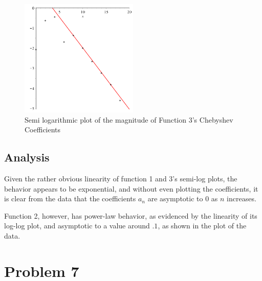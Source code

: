 \documentclass[11pt]{article} %
\begin{document}
{\begin{figure}[H]
\end{figure}
\begin{figure}[H]
\caption*{Semi logarithmic plot of the magnitude of Function 3's Chebyshev Coefficients}
\includegraphics[width=0.5\textwidth]{plots/problem6plot3.png}
\end{figure}

\subsection*{Analysis}
Given the rather obvious linearity of function 1 and 3's semi-log plots, the behavior appears to be exponential, and without even plotting the coefficients, it is clear from the data that the coefficients $a_n$ are asymptotic to $0$ as $n$ increases.
\par Function 2, however, has power-law behavior, as evidenced by the linearity of its log-log plot, and asymptotic to a value around $.1$, as shown in the plot of the data.

\newpage

\section*{Problem 7}
}
\end{document}
